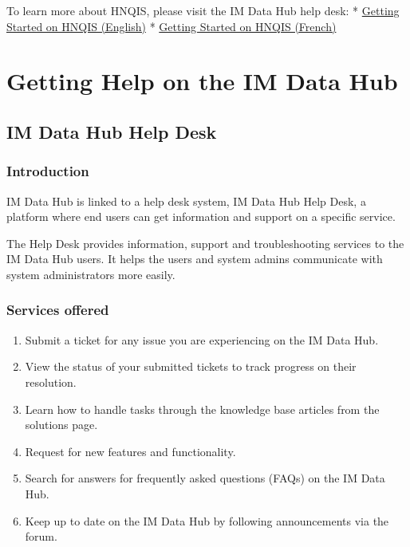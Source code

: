 \documentclass[]{book}
\providecommand{\tightlist}{%
  \setlength{\itemsep}{0pt}\setlength{\parskip}{0pt}}
\begin{document}
To learn more about HNQIS, please visit the IM Data Hub help desk:
* \href{https://imdatahub.freshdesk.com/en/support/solutions/articles/47001032548-getting-started-on-hnqis}{Getting Started on HNQIS (English)}
* \href{https://imdatahub.freshdesk.com/fr/support/solutions/articles/47001032548-getting-started-on-hnqis}{Getting Started on HNQIS (French)}

\hypertarget{trouble}{%
\chapter{Getting Help on the IM Data Hub}\label{trouble}}

\hypertarget{im-data-hub-help-desk}{%
\section{IM Data Hub Help Desk}\label{im-data-hub-help-desk}}

\hypertarget{introduction-5}{%
\subsection{Introduction}\label{introduction-5}}

IM Data Hub is linked to a help desk system, IM Data Hub Help Desk, a platform where end users can get information and support on a specific service.

The Help Desk provides information, support and troubleshooting services to the IM Data Hub users. It helps the users and system admins communicate with system administrators more easily.

\hypertarget{services-offered}{%
\subsection{Services offered}\label{services-offered}}

\begin{enumerate}
\def\labelenumi{\arabic{enumi}.}
\tightlist
\item
  Submit a ticket for any issue you are experiencing on the IM Data Hub.
\item
  View the status of your submitted tickets to track progress on their resolution.\\
\item
  Learn how to handle tasks through the knowledge base articles from the solutions page.
\item
  Request for new features and functionality.
\item
  Search for answers for frequently asked questions (FAQs) on the IM Data Hub.
\item
  Keep up to date on the IM Data Hub by following announcements via the forum.
\end{enumerate}
\end{document}
